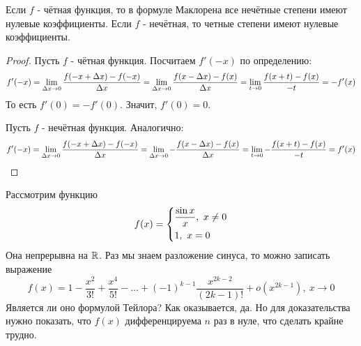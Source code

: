 \begin{note}
	Если $f$ - чётная функция, то в формуле Маклорена все
	нечётные степени имеют нулевые коэффициенты. Если $f$ -
	нечётная, то четные степени имеют нулевые коэффициенты.
\end{note}

\begin{proof}
	Пусть $f$ - чётная функция. Посчитаем $f'(-x)$ по определению:
	\[
		f'(-x) = \lim\limits_{\Delta x \to 0}
		\frac{f(-x + \Delta x) - f(-x)}{\Delta x} =
		\lim\limits_{\Delta x \to 0} \frac{f(x - \Delta x) -
		f(x)}{\Delta x} = \lim\limits_{t \to 0} \frac{f(x + t) -
		f(x)}{-t} = -f'(x)
	\]
	То есть $f'(0) = -f'(0)$. Значит, $f'(0) = 0$.
	
	Пусть $f$ - нечётная функция. Аналогично:
	\[
		f'(-x) = \lim\limits_{\Delta x \to 0} \frac{f(-x + \Delta x) -
		f(-x)}{\Delta x} = \lim\limits_{\Delta x \to 0}
		-\frac{f(x - \Delta x) - f(x)}{\Delta x} =
		\lim\limits_{t \to 0} -\frac{f(x + t) - f(x)}{-t} = f'(x)
	\]
\end{proof}

\begin{addition}
	Рассмотрим функцию
	\[
		f(x) = \left\{\begin{aligned}
		&{\frac{\sin x}{x},\ x \neq 0}
		\\
		&{1,\ x = 0}
		\end{aligned}\right.
	\]
	Она непрерывна на $\mathbb{R}$. Раз мы знаем разложение
	синуса, то можно записать выражение
	\[
		f(x) = 1 - \frac{x^2}{3!} + \frac{x^4}{5!} -
		\ldots + (-1)^{k - 1} \frac{x^{2k - 2}}{(2k - 1)!}
		+ o(x^{2k - 1}),\ x \to 0
	\]
	Является ли оно формулой Тейлора? Как оказывается, да. 
	Но для доказательства нужно показать, что $f(x)$
	дифференцируема $n$ раз в нуле, что сделать крайне трудно.
\end{addition}